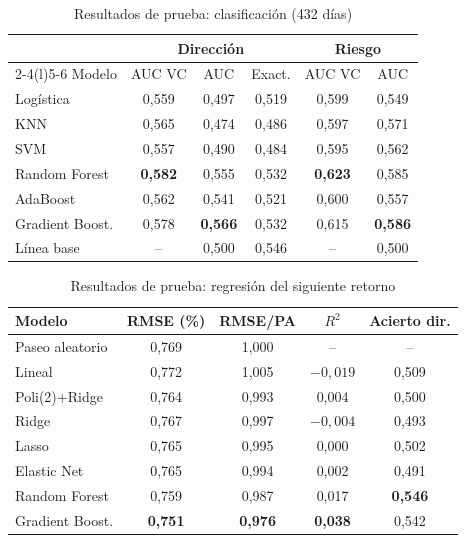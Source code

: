 \documentclass[conference]{IEEEtran}
\begin{document}
\begin{table}[t]
\caption{Resultados de prueba: clasificación (432 días)}
\label{tab:clf}
\centering
\footnotesize
\begin{tabular}{@{}lccccc@{}}
\toprule
 & \multicolumn{3}{c}{Dirección} & \multicolumn{2}{c}{Riesgo} \\
\cmidrule(lr){2-4}\cmidrule(l){5-6}
Modelo & AUC VC & AUC & Exact. & AUC VC & AUC \\
\midrule
Logística & 0,559 & 0,497 & 0,519 & 0,599 & 0,549 \\
KNN & 0,565 & 0,474 & 0,486 & 0,597 & 0,571 \\
SVM & 0,557 & 0,490 & 0,484 & 0,595 & 0,562 \\
Random Forest & \textbf{0,582} & 0,555 & 0,532 & \textbf{0,623} & 0,585 \\
AdaBoost & 0,562 & 0,541 & 0,521 & 0,600 & 0,557 \\
Gradient Boost. & 0,578 & \textbf{0,566} & 0,532 & 0,615 & \textbf{0,586} \\
\midrule
Línea base & -- & 0,500 & 0,546 & -- & 0,500 \\
\bottomrule
\end{tabular}
\end{table}

\begin{table}[t]
\caption{Resultados de prueba: regresión del siguiente retorno}
\label{tab:reg}
\centering
\footnotesize
\begin{tabular}{@{}lcccc@{}}
\toprule
Modelo & RMSE (\%) & RMSE/PA & $R^2$ & Acierto dir. \\
\midrule
Paseo aleatorio & 0,769 & 1,000 & -- & -- \\
Lineal & 0,772 & 1,005 & $-0{,}019$ & 0,509 \\
Poli(2)+Ridge & 0,764 & 0,993 & 0,004 & 0,500 \\
Ridge & 0,767 & 0,997 & $-0{,}004$ & 0,493 \\
Lasso & 0,765 & 0,995 & 0,000 & 0,502 \\
Elastic Net & 0,765 & 0,994 & 0,002 & 0,491 \\
Random Forest & 0,759 & 0,987 & 0,017 & \textbf{0,546} \\
Gradient Boost. & \textbf{0,751} & \textbf{0,976} & \textbf{0,038} & 0,542 \\
\bottomrule
\end{tabular}
\end{table}
\end{document}
